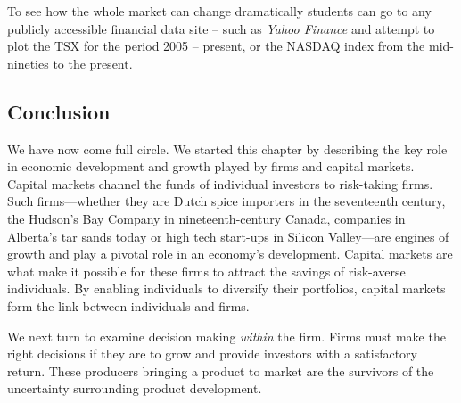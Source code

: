 To see how the whole market can change dramatically students can go to any publicly accessible financial data site -- such as \textit{Yahoo Finance} and attempt to plot the TSX for the period 2005 -- present, or the NASDAQ index from the mid-nineties to the present. 

\subsection*{Conclusion}

We have now come full circle. We started this chapter by describing the key role in economic development and growth played by firms and capital markets. Capital markets channel the funds of individual investors to risk-taking firms. Such firms---whether they are Dutch spice importers in the seventeenth century, the Hudson's Bay Company in nineteenth-century Canada, companies in Alberta's tar sands today or high tech start-ups in Silicon Valley---are engines of growth and play a pivotal role in an economy's development. Capital markets are what make it possible for these firms to attract the savings of risk-averse individuals. By enabling individuals to diversify their portfolios, capital markets form the link between individuals and firms.

We next turn to examine decision making \textit{within} the firm. Firms must make the right decisions if they are to grow and provide investors with a satisfactory return. These producers bringing a product to market are the survivors of the uncertainty surrounding product development.